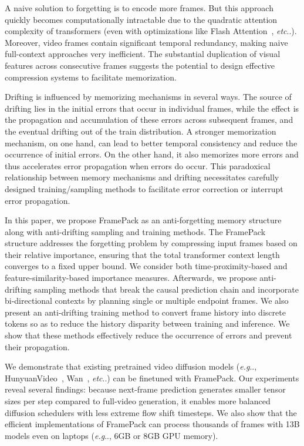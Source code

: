 \documentclass{article}
\makeatletter
\DeclareRobustCommand\onedot{\futurelet\@let@token\@onedot}
\def\@onedot{\ifx\@let@token.\else.\null\fi\xspace}
\def\eg{\emph{e.g}\onedot}
\def\etc{\emph{etc}\onedot}
\makeatother
\begin{document}
A naive solution to forgetting is to encode more frames. But this approach quickly becomes computationally intractable due to the quadratic attention complexity of transformers (even with optimizations like Flash Attention~\cite{dao2022flashattentionfastmemoryefficientexact}, \etc). Moreover, video frames contain significant temporal redundancy, making naive full-context approaches very inefficient. The substantial duplication of visual features across consecutive frames suggests the potential to design effective compression systems to facilitate memorization.

Drifting is influenced by memorizing mechanisms in several ways. The source of drifting lies in the initial errors that occur in individual frames, while the effect is the propagation and accumulation of these errors across subsequent frames, and the eventual drifting out of the train distribution. A stronger memorization mechanism, on one hand, can lead to better temporal consistency and reduce the occurrence of initial errors. On the other hand, it also memorizes more errors and thus accelerates error propagation when errors do occur. This paradoxical relationship between memory mechanisms and drifting necessitates carefully designed training/sampling methods to facilitate error correction or interrupt error propagation.

In this paper, we propose FramePack as an anti-forgetting memory structure along with anti-drifting sampling and training methods. The FramePack structure addresses the forgetting problem by compressing input frames based on their relative importance, ensuring that the total transformer context length converges to a fixed upper bound. We consider both time-proximity-based and feature-similarity-based importance measures. Afterwards, we propose anti-drifting sampling methods that break the causal prediction chain and incorporate bi-directional contexts by planning single or multiple endpoint frames. We also present an anti-drifting training method to convert frame history into discrete tokens so as to reduce the history disparity between training and inference. We show that these methods effectively reduce the occurrence of errors and prevent their propagation.

We demonstrate that existing pretrained video diffusion models (\eg, HunyuanVideo~\cite{kong2024hunyuanvideo}, Wan~\cite{wang2025wan}, \etc) can be finetuned with FramePack. Our experiments reveal several findings: because next-frame prediction generates smaller tensor sizes per step compared to full-video generation, it enables more balanced diffusion schedulers with less extreme flow shift timesteps. We also show that the efficient implementations of FramePack can process thousands of frames with 13B models even on laptops (\eg, 6GB or 8GB GPU memory).
\end{document}

